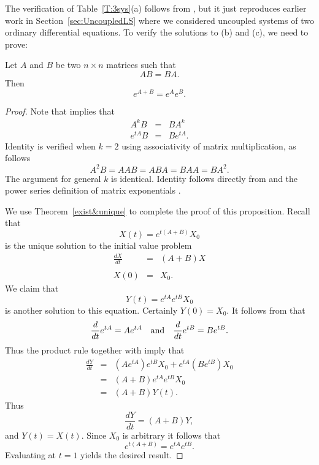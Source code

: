 \documentclass{ximera}
\begin{document}
The verification of Table~\ref{T:3sys}(a) follows from , but
it just reproduces earlier work in Section~\ref{sec:UncoupledLS} where we
considered uncoupled systems of two ordinary differential equations.
To verify the solutions to (b) and (c), we need to prove:

\begin{prop}  \label{P:expAB}
Let $A$ and $B$ be two $n\times n$ matrices such that
\begin{equation} \label{e:AB=BA}
AB = BA.
\end{equation}
Then
\[
e^{A+B} = e^A e^B.
\]
\end{prop} 

\begin{proof}  Note that  implies that
\begin{eqnarray}
A^kB    & = & BA^k  \label{e:AkB=BAk}\\
e^{tA}B & = & Be^{tA}. \label{e:etAB=BetA}
\end{eqnarray}
Identity  is verified when $k=2$ using
associativity of matrix multiplication, as follows
\[
A^2B = AAB = ABA = BAA = BA^2.
\]
The argument for general $k$ is identical.  Identity
 follows directly from  and
the power series definition of matrix exponentials .

We use Theorem~\ref{exist&unique}  to complete the proof of this
proposition.  Recall that
\[
X(t) = e^{t(A+B)}X_0
\]
is the unique solution to the initial value problem
\begin{eqnarray*}
\frac{dX}{dt} & = & (A+B)X \\ \\
X(0) & = & X_0.
\end{eqnarray*}
We claim that
\[
Y(t) = e^{tA}e^{tB}X_0
\]
is another solution to this equation.  Certainly $Y(0)=X_0$.  It
follows from  that
\[
\frac{d}{dt}e^{tA} = Ae^{tA} \quad\mbox{and}\quad \frac{d}{dt}e^{tB} = Be^{tB}.
\]
Thus the product rule together with  imply that
\begin{eqnarray*}
\frac{dY}{dt} & = & \left(Ae^{tA}\right)e^{tB}X_0 +
e^{tA}\left(Be^{tB}\right)X_0 \\
& = & (A+B) e^{tA} e^{tB} X_0\\
& = & (A+B)Y(t).
\end{eqnarray*}
Thus
\[
\frac{dY}{dt} = (A+B)Y,
\]
and $Y(t)=X(t)$.  Since $X_0$ is arbitrary it follows that
\[
e^{t(A+B)} = e^{tA}e^{tB}.
\]
Evaluating at $t=1$ yields the desired result.  \end{proof}
\end{document}
